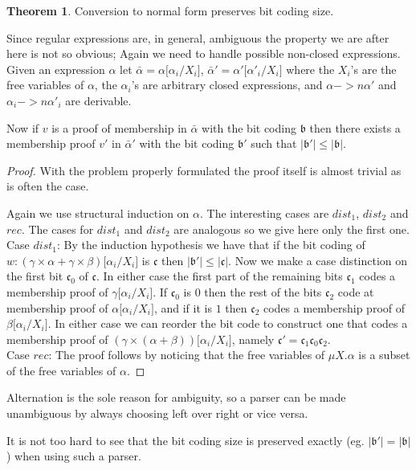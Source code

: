 \documentclass[a4paper, oneside]{memoir}
\theoremstyle{definition}
\newtheorem{theorem}{Theorem}
\begin{document}
\begin{theorem}
  Conversion to normal form preserves bit coding size.

  Since regular expressions are, in general, ambiguous the property we are after
  here is not so obvious; Again we need to handle possible non-closed
  expressions. Given an expression $\alpha$ let $\bar{\alpha} = \alpha \lbrack
  \alpha_i / X_i \rbrack$, $\bar{\alpha}' = \alpha' \lbrack \alpha'_i / X_i
  \rbrack$ where the $X_i$'s are the free variables of $\alpha$, the
  $\alpha_i$'s are arbitrary closed expressions, and $\alpha ->n \alpha'$ and
  $\alpha_i ->n \alpha'_i$ are derivable.

  Now if $v$ is a proof of membership in $\bar{\alpha}$ with the bit coding
  $\mathfrak{b}$ then there exists a membership proof $v'$ in $\bar{\alpha}'$
  with the bit coding $\mathfrak{b'}$ such that $| \mathfrak{b'} | \leq |
  \mathfrak{b} |$.

  \begin{proof}
    With the problem properly formulated the proof itself is almost trivial as
    is often the case.

    Again we use structural induction on $\alpha$. The interesting cases are
    $dist_1$, $dist_2$ and $rec$. The cases for $dist_1$ and $dist_2$ are
    analogous so we give here only the first one.\\[1em]


    Case $dist_1$: By the induction hypothesis we have that if the bit coding of
    $w : (\gamma \times \alpha + \gamma \times \beta)\lbrack \alpha_i / X_i
    \rbrack$ is $\mathfrak{c}$ then $| \mathfrak{b'} | \leq | \mathfrak{c}
    |$. Now we make a case distinction on the first bit $\mathfrak{c_0}$ of
    $\mathfrak{c}$. In either case the first part of the remaining bits
    $\mathfrak{c_1}$ codes a membership proof of $\gamma\lbrack \alpha_i / X_i
    \rbrack$. If $\mathfrak{c_0}$ is $0$ then the rest of the bits
    $\mathfrak{c_2}$ code at membership proof of $\alpha\lbrack \alpha_i / X_i
    \rbrack$, and if it is $1$ then $\mathfrak{c_2}$ codes a membership proof of
    $\beta\lbrack \alpha_i / X_i \rbrack$. In either case we can reorder the bit
    code to construct one that codes a membership proof of $(\gamma \times
    (\alpha + \beta))\lbrack \alpha_i / X_i \rbrack$, namely
    $\mathfrak{c'} = \mathfrak{c_1}\mathfrak{c_0}\mathfrak{c_2}$.\\[1em]

    Case $rec$: The
    proof follows by noticing that the free variables of $\mu X. \alpha$ is a
    subset of the free variables of $\alpha$.
  \end{proof}

  Alternation is the sole reason for ambiguity, so a parser can be made
  unambiguous by always choosing left over right or vice versa.

  It is not too hard to see that the bit coding size is preserved exactly
  (eg. $| \mathfrak{b'} | = | \mathfrak{b} |$) when using such a parser.
\end{theorem}
\end{document}
